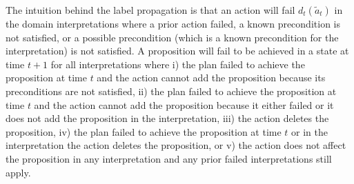\documentclass{article}
\newtheorem{theorem}{Theorem}[section]
\begin{document}
%



\noindent  The intuition behind the label propagation is that an action will fail $d_t(\tilde{a}_t)$ in the domain interpretations where a prior action failed, a known precondition is not satisfied, or a possible precondition (which is a known precondition for the interpretation) is not satisfied.  A proposition will fail to be achieved in a state at time $t+1$ for all interpretations where i) the plan failed to achieve the proposition at time $t$ and the action cannot add the proposition because its preconditions are not satisfied, ii) the plan failed to achieve the proposition at time $t$ and the action cannot add the proposition because it either failed or it does not add the proposition in the interpretation, iii) the action deletes the proposition, iv) the plan failed to achieve the proposition at time $t$ or in the interpretation the action deletes the proposition, or v) the action does not affect the proposition in any interpretation and any prior failed interpretations still apply.
\end{document}
